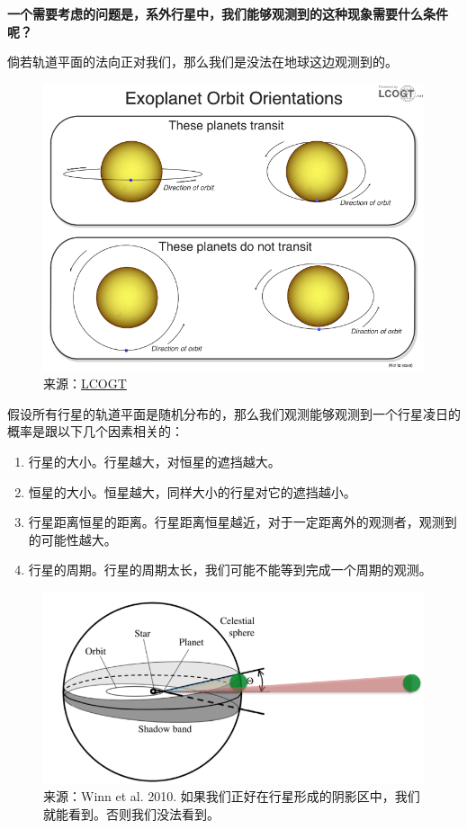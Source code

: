 \documentclass[letterpaper,10pt,english]{sphinxmanual}
\begin{document}
\textbf{一个需要考虑的问题是，系外行星中，我们能够观测到的这种现象需要什么条件呢？}

倘若轨道平面的法向正对我们，那么我们是没法在地球这边观测到的。
\begin{figure}[htbp]
\centering
\capstart

\includegraphics{exoplanetsTransitNonTrasit.png}
\caption{来源：\href{http://lcogt.net/spacebook/transit-method}{LCOGT}}\end{figure}

假设所有行星的轨道平面是随机分布的，那么我们观测能够观测到一个行星凌日的概率是跟以下几个因素相关的：
\begin{enumerate}
\item {} 
行星的大小。行星越大，对恒星的遮挡越大。

\item {} 
恒星的大小。恒星越大，同样大小的行星对它的遮挡越小。

\item {} 
行星距离恒星的距离。行星距离恒星越近，对于一定距离外的观测者，观测到的可能性越大。

\item {} 
行星的周期。行星的周期太长，我们可能不能等到完成一个周期的观测。

\end{enumerate}
\begin{figure}[htbp]
\centering
\capstart

\includegraphics{shadowZone.png}
\caption{来源：Winn et al. 2010. 如果我们正好在行星形成的阴影区中，我们就能看到。否则我们没法看到。}\end{figure}
\end{document}
